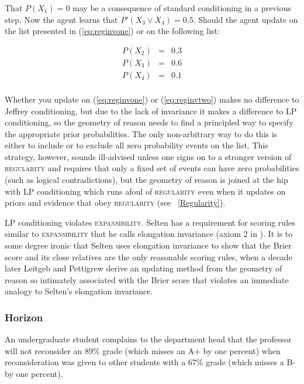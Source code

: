 \documentclass[12pt]{article}
\begin{document}
That $P(X_{1})=0$ may be a consequence of standard conditioning in a
previous step. Now the agent learns that $P'(X_{3}\vee{}X_{4})=0.5$.
Should the agent update on the list presented in (\ref{eq:reginvone})
or on the following list:

\begin{equation}
  \label{eq:reginvtwo}
  \begin{array}{rcl}
  P(X_{2})&=&0.3\\
  P(X_{3})&=&0.6\\
  P(X_{4})&=&0.1\\
\end{array}
\end{equation}

Whether you update on (\ref{eq:reginvone}) or (\ref{eq:reginvtwo})
makes no difference to Jeffrey conditioning, but due to the lack of
invariance it makes a difference to LP conditioning, so the geometry
of reason needs to find a principled way to specify the appropriate
prior probabilities. The only non-arbitrary way to do this is either
to include or to exclude all zero probability events on the list. This
strategy, however, sounds ill-advised unless one signs on to a
stronger version of \textsc{regularity} and requires that only a fixed
set of events can have zero probabilities (such as logical
contradictions), but the geometry of reason is joined at the hip with
LP conditioning which runs afoul of \textsc{regularity} even when it
updates on priors and evidence that obey \textsc{regularity} (see
{\ubsection}~\ref{Regularity}).

LP conditioning violates \textsc{expansibility}. Selten has a
requirement for scoring rules similar to \textsc{expansibility} that
he calls elongation invariance (axiom 2 in ).
It is to some degree ironic that Selten uses elongation invariance to
show that the Brier score and its close relatives are the only
reasonable scoring rules, when a decade later Leitgeb and Pettigrew
derive an updating method from the geometry of reason so intimately
associated with the Brier score that violates an immediate analogy to
Selten's elongation invariance.

\subsubsection{Horizon}
\label{Horizon}

\begin{example}
  \label{ex:complaint}
  An undergraduate student complains to the department head that the
  professor will not reconsider an 89\% grade (which misses an A+ by
  one percent) when reconsideration was given to other students with a
  67\% grade (which misses a B- by one percent).
\end{example}
\end{document}
